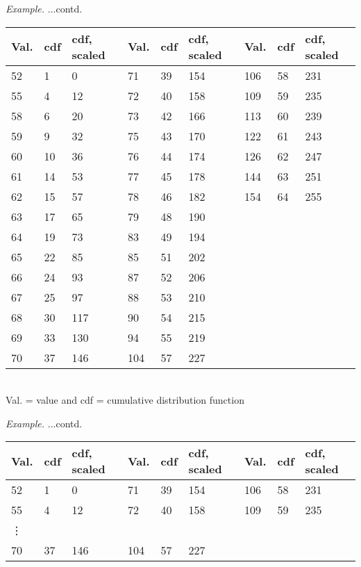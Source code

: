 \documentclass{response}
\begin{document}
{{\huge \em Example.} ...contd.
\begin{center}
\renewcommand{\tabcolsep}{0.1em}
\begin{tabular}{|l|l|l| l|l|l| l|l|l|}
\hline
Val. & cdf	& cdf, scaled & Val. & cdf & cdf, scaled &	Val. & cdf & cdf, scaled \\ \hline \hline
52	& 1	& 0 	& 71	& 39	& 154 & 106	& 58	& 231 \\ \hline
55	& 4	& 12 	& 72	& 40	& 158 & 109	& 59	& 235\\ \hline
58	& 6	& 20	& 73	& 42	& 166 & 113	& 60	& 239\\ \hline
59	& 9	& 32	& 75	& 43	& 170 & 122	& 61	& 243\\ \hline
60	& 10	& 36& 76	& 44	& 174 & 126	& 62	& 247\\ \hline
61	& 14	& 53& 77	& 45	& 178 & 144	& 63	& 251\\ \hline
62	& 15	& 57& 78	& 46	& 182 & 154	& 64	& 255\\ \hline
63	& 17	& 65& 79	& 48	& 190 &&& \\ \hline
64	& 19	& 73& 83	& 49	& 194 &&& \\ \hline
65	& 22	& 85& 85	& 51	& 202 &&& \\ \hline
66	& 24	& 93& 87	& 52	& 206 &&& \\ \hline
67	& 25	& 97& 88	& 53	& 210 &&& \\ \hline
68	& 30	& 117&90	& 54	& 215&&& \\ \hline
69	& 33	& 130&94	& 55	& 219&&& \\ \hline
70	& 37	& 146&104	& 57	& 227 &&& \\ \hline
\end{tabular}
\end{center}
\mbox{}\\
Val. = value and cdf = cumulative distribution function%





\newpage

\bigskip

{\huge \em Example.} ...contd.

\begin{center}
\renewcommand{\tabcolsep}{0.1em}
\begin{tabular}{|l|l|l| l|l|l| l|l|l|}
\hline
Val. & cdf	& cdf, scaled & Val. & cdf & cdf, scaled &	Val. & cdf & cdf, scaled \\ \hline \hline
52	& 1	& 0 	& 71	& 39	& 154 & 106	& 58	& 231 \\ \hline
55	& 4	& 12 	& 72	& 40	& 158 & 109	& 59	& 235\\ \hline
\multicolumn{9}{l}{\vdots}\\ 
70	& 37	& 146&104	& 57	& 227 &&& \\ \hline
\end{tabular}
\end{center}
\mbox{}\\

}
\end{document}

